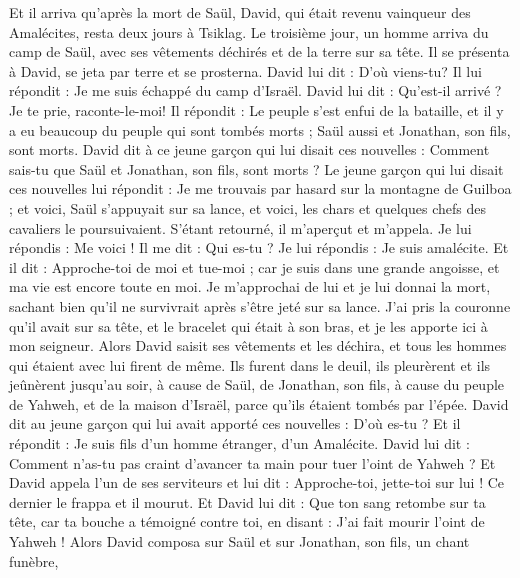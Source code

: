 \begin{multicols}{2}
\VerseOne{}Et il arriva qu'après la mort de Saül, David, qui était revenu vainqueur des Amalécites, resta deux jours à Tsiklag.
Le troisième jour, un homme arriva du camp de Saül, avec ses vêtements déchirés et de la terre sur sa tête. Il se présenta à David, se jeta par terre et se prosterna.
David lui dit : D'où viens-tu? Il lui répondit : Je me suis échappé du camp d'Israël.
David lui dit : Qu'est-il arrivé ? Je te prie, raconte-le-moi! Il répondit : Le peuple s'est enfui de la bataille, et il y a eu beaucoup du peuple qui sont tombés morts ; Saül aussi et Jonathan, son fils, sont morts.
David dit à ce jeune garçon qui lui disait ces nouvelles : Comment sais-tu que Saül et Jonathan, son fils, sont morts ?
Le jeune garçon qui lui disait ces nouvelles lui répondit : Je me trouvais par hasard sur la montagne de Guilboa ; et voici, Saül s'appuyait sur sa lance, et voici, les chars et quelques chefs des cavaliers le poursuivaient.
S'étant retourné, il m'aperçut et m'appela. Je lui répondis : Me voici !
Il me dit : Qui es-tu ? Je lui répondis : Je suis amalécite.
Et il dit : Approche-toi de moi et tue-moi ; car je suis dans une grande angoisse, et ma vie est encore toute en moi.
Je m'approchai de lui et je lui donnai la mort, sachant bien qu'il ne survivrait après s'être jeté sur sa lance. J'ai pris la couronne qu'il avait sur sa tête, et le bracelet qui était à son bras, et je les apporte ici à mon seigneur.
Alors David saisit ses vêtements et les déchira, et tous les hommes qui étaient avec lui firent de même.
Ils furent dans le deuil, ils pleurèrent et ils jeûnèrent jusqu'au soir, à cause de Saül, de Jonathan, son fils, à cause du peuple de Yahweh, et de la maison d'Israël, parce qu'ils étaient tombés par l'épée.
David dit au jeune garçon qui lui avait apporté ces nouvelles : D'où es-tu ? Et il répondit : Je suis fils d'un homme étranger, d'un Amalécite.
David lui dit : Comment n'as-tu pas craint d'avancer ta main pour tuer l'oint de Yahweh ?
Et David appela l'un de ses serviteurs et lui dit : Approche-toi, jette-toi sur lui ! Ce dernier le frappa et il mourut.
Et David lui dit : Que ton sang retombe sur ta tête, car ta bouche a témoigné contre toi, en disant : J'ai fait mourir l'oint de Yahweh !
Alors David composa sur Saül et sur Jonathan, son fils, un chant funèbre,

\end{multicols}
